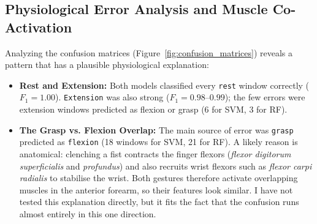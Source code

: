 \documentclass[11pt,a4paper]{article}
\begin{document}
\begin{table}[htbp]
\centering
\caption{Detailed Precision, Recall, and F1-Score Breakdown on Held-Out Test Set (624 Windows)}
\label{tab:baseline_metrics}
\end{table}

\subsection{Physiological Error Analysis and Muscle Co-Activation}
Analyzing the confusion matrices (Figure~\ref{fig:confusion_matrices}) reveals a pattern that has a plausible physiological explanation:
\begin{itemize}
    \item \textbf{Rest and Extension:} Both models classified every \texttt{rest} window correctly ($F_1 = 1.00$). \texttt{Extension} was also strong ($F_1 = 0.98\text{--}0.99$); the few errors were extension windows predicted as flexion or grasp (6 for SVM, 3 for RF).
    \item \textbf{The Grasp vs. Flexion Overlap:} The main source of error was \texttt{grasp} predicted as \texttt{flexion} (18 windows for SVM, 21 for RF). A likely reason is anatomical: clenching a fist contracts the finger flexors (\textit{flexor digitorum superficialis} and \textit{profundus}) and also recruits wrist flexors such as \textit{flexor carpi radialis} to stabilise the wrist. Both gestures therefore activate overlapping muscles in the anterior forearm, so their features look similar. I have not tested this explanation directly, but it fits the fact that the confusion runs almost entirely in this one direction.
\end{itemize}
\end{document}
